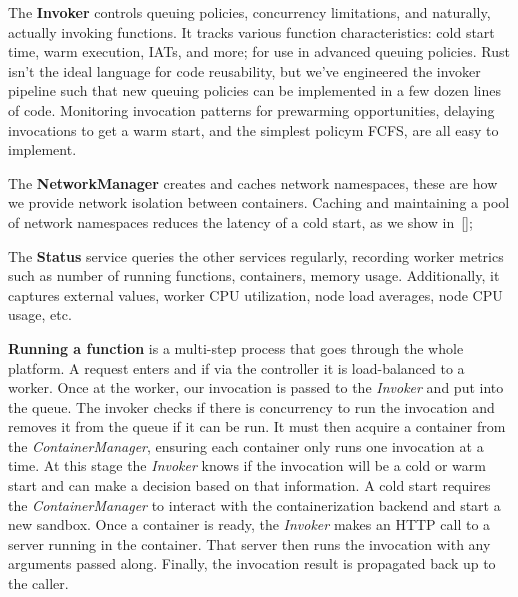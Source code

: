 The \textbf{Invoker} controls queuing policies, concurrency limitations, and naturally, actually invoking functions.
It tracks various function characteristics: cold start time, warm execution, IATs, and more; for use in advanced queuing policies.
Rust isn't the ideal language for code reusability, but we've engineered the invoker pipeline such that new queuing policies can be implemented in a few dozen lines of code.
Monitoring invocation patterns for prewarming opportunities, delaying invocations to get a warm start, and the simplest policym FCFS, are all easy to implement.

The \textbf{NetworkManager} creates and caches network namespaces, these are how we provide network isolation between containers.
Caching and maintaining a pool of network namespaces reduces the latency of a cold start, as we show in~\ref{};

The \textbf{Status} service queries the other services regularly, recording worker metrics such as number of running functions, containers, memory usage.
Additionally, it captures external values, worker CPU utilization, node load averages, node CPU usage, etc.



\textbf{Running a function} is a multi-step process that goes through the whole platform. %
A request enters \sysname{} and if via the controller it is load-balanced to a worker.
Once at the worker, our invocation is passed to the \emph{Invoker} and put into the queue.
The invoker checks if there is concurrency to run the invocation and removes it from the queue if it can be run.
It must then acquire a container from the \emph{ContainerManager}, ensuring each container only runs one invocation at a time.
At this stage the \emph{Invoker} knows if the invocation will be a cold or warm start and can make a decision based on that information.
A cold start requires the \emph{ContainerManager} to interact with the containerization backend and start a new sandbox.
Once a container is ready, the \emph{Invoker} makes an HTTP call to a server running in the container.
That server then runs the invocation with any arguments passed along.
Finally, the invocation result is propagated back up to the caller.

